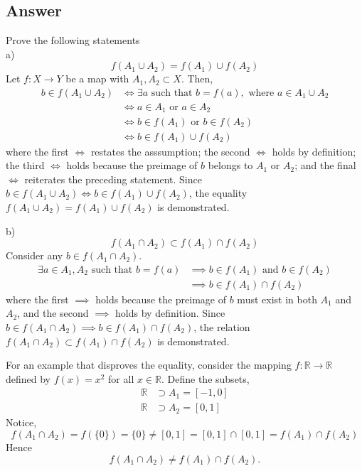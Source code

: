 \documentclass[
	12pt, %
]{fphw}
\newcommand\set[1]{\{#1\}}
\newcommand\qed{\text{$\blacksquare$}}
\newcommand\R{\mathbb{R}}
\begin{document}
\subsection*{Answer}Prove the following statements\\
a) $$f (A_1 \cup A_2) = f(A_1) \cup f(A_2)$$
Let $f: X \to Y$ be a map with $A_1, A_2 \subset X$. Then,
\begin{align*}
b \in f (A_1 \cup A_2) &\Longleftrightarrow \exists a \text{ such that } b = f(a), \text{ where } a \in A_1 \cup A_2\\
&\Longleftrightarrow a \in A_1 \text{ or } a \in A_2\\
&\Longleftrightarrow b \in f(A_1) \text{ or } b \in f(A_2)\\
&\Longleftrightarrow b \in f(A_1) \cup f(A_2)
\end{align*}
where the first $\Leftrightarrow$ restates the asssumption; the second $\Leftrightarrow$ holds by definition; the third $\Leftrightarrow$ holds because the preimage of $b$ belongs to $A_1$ or $A_2$; and the final $\Leftrightarrow$ reiterates the preceding statement. Since $b \in f (A_1 \cup A_2) \Leftrightarrow b \in f(A_1) \cup f(A_2)$, the equality $f (A_1 \cup A_2) = f(A_1) \cup f(A_2)$ is demonstrated.  \qed

\vspace{10 pt}

\noindent
b) $$f(A_1 \cap A_2) \subset f(A_1) \cap f(A_2)$$
Consider any $b \in f(A_1 \cap A_2)$.
\begin{align*}
\exists a \in A_1, A_2 \text { such that } b = f(a) &\implies b \in f(A_1) \text{ and } b \in f(A_2)\\
&\implies b \in f(A_1) \cap f(A_2)
\end{align*}
where the first $\implies$ holds because the preimage of $b$ must exist in both $A_1$ and $A_2$, and the second $\implies$ holds by definition. Since $b \in f(A_1 \cap A_2) \implies b \in f(A_1) \cap f(A_2)$, the relation $f(A_1 \cap A_2) \subset f(A_1) \cap f(A_2)$ is demonstrated. \qed

For an example that disproves the equality, consider the mapping $f : \R \to \R$ defined by $f(x) = x^2$ for all $x \in \R$. Define the subsets,
\begin{align*}
\R &\supset A_1 = [-1, 0]\\
\R &\supset A_2 = [0, 1]
\end{align*}
Notice,
$$f(A_1 \cap A_2) = f(\set{0}) = \set{0} \ne [0, 1] = [0, 1] \cap [0, 1] = f(A_1) \cap f(A_2)$$
Hence 
$$f(A_1 \cap A_2) \ne f(A_1) \cap f(A_2).$$
\end{document}
